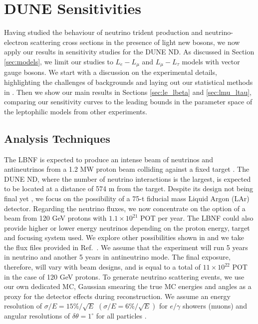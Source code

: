 \section{\label{sec:sensitivities}DUNE Sensitivities}

Having studied the behaviour of neutrino trident production and neutrino-electron scattering cross sections in the presence of light new bosons, we now apply our results in sensitivity studies for the DUNE ND. As discussed in Section \ref{sec:models}, we limit our studies to $L_e- L_\mu$ and $L_\mu- L_\tau$ models with vector gauge bosons. We start with a discussion on the experimental details, highlighting the challenges of backgrounds and laying out our statistical methods in . Then we show our main results in Sections \ref{sec:le_lbeta} and \ref{sec:lmu_ltau}, comparing our sensitivity curves to the leading bounds in the parameter space of the leptophilic models from other experiments.

\subsection{Analysis Techniques}\label{sec:experimental}

The LBNF is expected to produce an intense beam of neutrinos and antineutrinos from a 1.2 MW proton beam colliding against a fixed target \cite{Acciarri:2016crz}. The DUNE ND, where the number of neutrino interactions is the largest, is expected to be located at a distance of 574 m from the target. Despite its design not being final yet \cite{Roeck:2018,Manly:2018}, we focus on the possibility of a 75-t fiducial mass Liquid Argon (LAr) detector. Regarding the neutrino fluxes, we now concentrate on the option of a beam from 120 GeV protons with $1.1\times10^{21}$ POT per year. The LBNF could also provide higher or lower energy neutrinos depending on the proton energy, target and focusing system used. We explore other possibilities shown in  and we take the flux files provided in Ref.~\cite{DUNE:flux,DUNE:flux_updated}. We assume that the experiment will run 5 years in neutrino and another 5 years in antineutrino mode. The final exposure, therefore, will vary with beam designs, and is equal to a total of $11\times10^{22}$ POT in the case of 120 GeV protons. To generate neutrino scattering events, we use our own dedicated MC, Gaussian smearing the true MC energies and angles as a proxy for the detector effects during reconstruction. We assume an energy resolution of $\sigma/E = 15\%/\sqrt{E}$ $(\sigma/E = 6\%/\sqrt{E})$ for $e/\gamma$ showers (muons) and angular resolutions of $\delta\theta=1^\circ$ for all particles \cite{DUNECDRvolII}.

